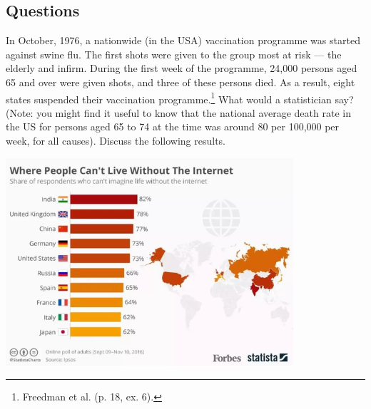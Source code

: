 \subsection*{Questions}
\begin{questions}
  \question In October, 1976, a nationwide (in the USA) vaccination programme was started against swine flu. The first shots were given to the group
            most at risk --- the elderly and infirm. During the first week of the programme, 24,000 persons aged 65 and over were given shots,
            and three of these persons died. As a result, eight states suspended their vaccination programme.\footnote{Freedman et al. (p. 18, ex. 6).}
            What would a statistician say? (Note: you might find it useful to know that the national average death rate in the US for persons aged 65
            to 74 at the time was around 80 per 100,000 per week, for all causes).
  \question Discuss the following results.
            \begin{center}
              \includegraphics[width=0.8\textwidth]{badsurvey}
            \end{center}
\end{questions}

